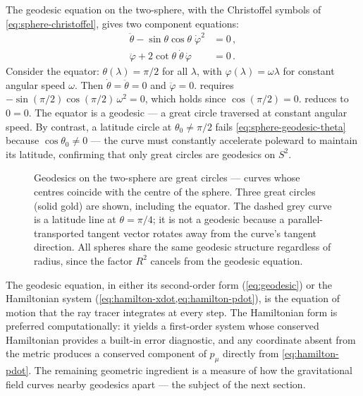 The geodesic equation on the two-sphere, with the Christoffel symbols of
\cref{eq:sphere-christoffel}, gives two component equations:
%
\begin{align}
  \ddot{\theta} - \sin\theta\cos\theta\;\dot{\varphi}^2 &= 0 \,,
  \label{eq:sphere-geodesic-theta} \\
  \ddot{\varphi} + 2\cot\theta\;\dot{\theta}\,\dot{\varphi} &= 0 \,.
  \label{eq:sphere-geodesic-phi}
\end{align}
%
Consider the equator: $\theta(\lambda) = \pi/2$ for all $\lambda$, with
$\varphi(\lambda) = \omega\lambda$ for constant angular speed $\omega$.  Then
$\dot{\theta} = \ddot{\theta} = 0$ and $\ddot{\varphi} = 0$.
 requires
$-\sin(\pi/2)\cos(\pi/2)\,\omega^2 = 0$, which holds since
$\cos(\pi/2) = 0$.   reduces to $0 = 0$.  The
equator is a geodesic --- a great circle traversed at constant angular speed.
By contrast, a latitude circle at $\theta_0 \neq \pi/2$ fails
\cref{eq:sphere-geodesic-theta} because $\cos\theta_0 \neq 0$ --- the curve
must constantly accelerate poleward to maintain its latitude, confirming that
only great circles are geodesics on $S^2$.

\begin{figure}[htbp]
  \centering
  
  \caption[Geodesics on the two-sphere]{Geodesics on the two-sphere are great circles --- curves whose
    centres coincide with the centre of the sphere.  Three great circles
    (solid gold) are shown, including the equator.  The dashed grey curve
    is a latitude line at $\theta = \pi/4$; it is not a geodesic because
    a parallel-transported tangent vector rotates away from the curve's
    tangent direction.  All spheres share the same geodesic structure
    regardless of radius, since the factor $R^2$ cancels from the
    geodesic equation.}
  \label{fig:sphere-geodesics}
\end{figure}

The geodesic equation, in either its second-order form (\cref{eq:geodesic}) or
the Hamiltonian system (\cref{eq:hamilton-xdot,eq:hamilton-pdot}), is the
equation of motion that the ray tracer integrates at every step.  The
Hamiltonian form is preferred computationally: it yields a first-order system
whose conserved Hamiltonian provides a built-in error diagnostic, and any
coordinate absent from the metric produces a conserved component of $p_\mu$
directly from \cref{eq:hamilton-pdot}.  The remaining geometric ingredient is a
measure of how the gravitational field curves nearby geodesics apart --- the
subject of the next section.
